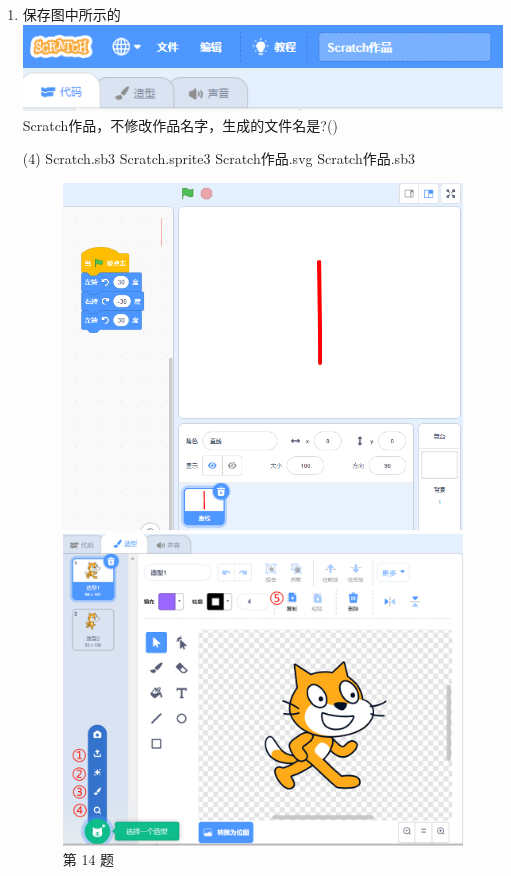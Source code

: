 \documentclass[10pt, a4paper]{article}
\begin{document}
\begin{enumerate}
        \item 保存图中所示的\includegraphics[width=.3\textwidth]{16.png}Scratch作品，不修改作品名字，生成的文件名是?(\qquad)
        \begin{tasks}(4)
            \task Scratch.sb3
            \task Scratch.sprite3
            \task Scratch作品.svg
            \task Scratch作品.sb3
        \end{tasks}

        \begin{figure}[htbp]
            \centering
            \begin{minipage}[t]{.25\textwidth}
                \centering
                \includegraphics[width=\textwidth]{14.png}
                \caption*{第 14 题}
            \end{minipage}
            \begin{minipage}[t]{.28\textwidth}
                \centering
                \includegraphics[width=\textwidth]{18.png}

\end{minipage}
\end{figure}
\end{enumerate}
\end{document}
